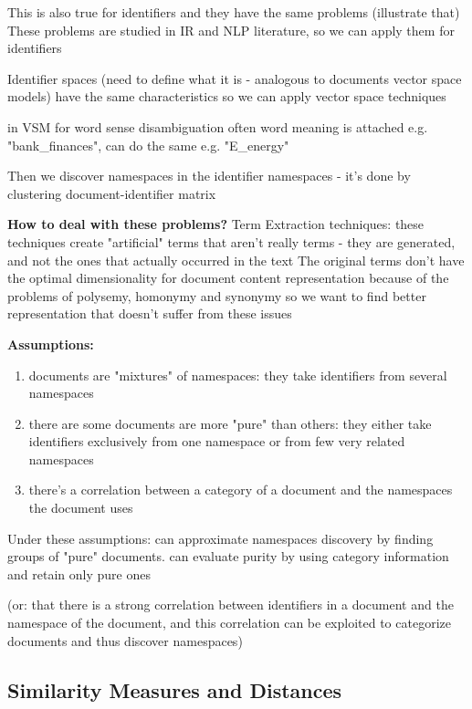 This is also true for identifiers and they have the same problems (illustrate that)
These problems are studied in IR and NLP literature, so we can apply them for identifiers


Identifier spaces (need to define what it is - analogous to documents vector space models) have the same characteristics so we can apply vector space techniques

in VSM for word sense disambiguation often word meaning is attached e.g. "bank\_finances", can do the same e.g. "E\_energy"

Then we discover namespaces in the identifier namespaces - it's done by clustering document-identifier matrix


\textbf{How to deal with these problems?} Term Extraction techniques:
these techniques create "artificial" terms that aren't really terms - they are generated, and not the ones that actually occurred in the text
The original terms don't have the optimal dimensionality for document content representation
because of the problems of polysemy, homonymy and synonymy
so we want to find better representation that doesn't suffer from these issues


\textbf{Assumptions:}


\begin{enumerate}
 \item documents are "mixtures" of namespaces: they take identifiers from several namespaces
 \item there are some documents are more "pure" than others: they either take identifiers exclusively from one namespace or from few very related namespaces
 \item there's a correlation between a category of a document and the namespaces
the document uses
\end{enumerate}




Under these assumptions: can approximate namespaces discovery by finding groups of "pure" documents. can evaluate purity by using category information and retain only pure ones

(or: that there is a strong correlation between identifiers in
a document and the namespace of the document, and this correlation can be exploited to
categorize documents and thus discover namespaces)




\subsection{Similarity Measures and Distances}



